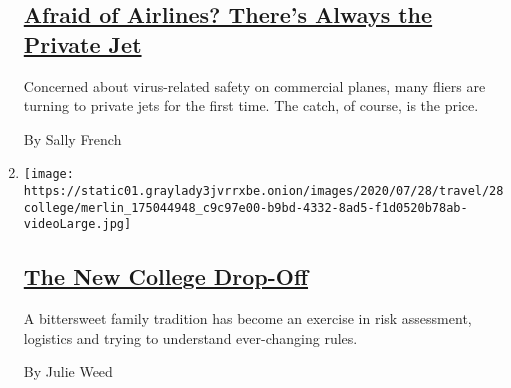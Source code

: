 \begin{enumerate}
{  \subsection{\texorpdfstring{\href{/2020/07/30/travel/private-jets-coronavirus.html}{Afraid
  of Airlines? There's Always the Private
  Jet}}{Afraid of Airlines? There's Always the Private Jet}}\label{afraid-of-airlines-theres-always-the-private-jet}}

  Concerned about virus-related safety on commercial planes, many fliers
  are turning to private jets for the first time. The catch, of course,
  is the price.

  By Sally French
\item
  \texttt{[image: https://static01.graylady3jvrrxbe.onion/images/2020/07/28/travel/28college/merlin\_175044948\_c9c97e00-b9bd-4332-8ad5-f1d0520b78ab-videoLarge.jpg]}

  \hypertarget{the-new-college-drop-off}{%
  \subsection{\texorpdfstring{\href{/2020/07/29/travel/virus-college-travel-restrictions.html}{The
  New College
  Drop-Off}}{The New College Drop-Off}}\label{the-new-college-drop-off}}

  A bittersweet family tradition has become an exercise in risk
  assessment, logistics and trying to understand ever-changing rules.

  By Julie Weed
\end{enumerate}

